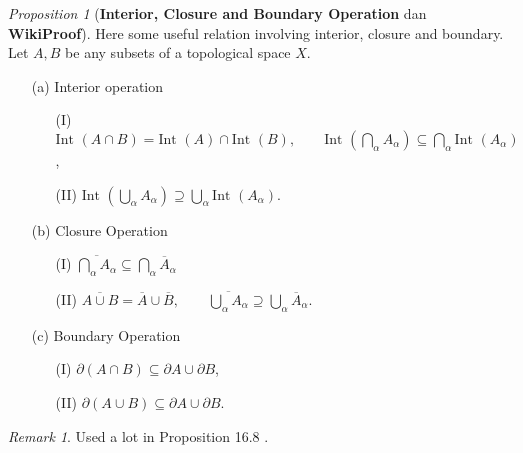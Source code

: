 \documentclass[a4paper]{article}
\theoremstyle{remark}
\newtheorem*{remark}{Remark}
\newtheorem{prop}{Proposition}
\newcommand{\doo}{\partial}    %
\newcommand{\subhim}{\subseteq} %
\newcommand{\Inter}{\text{Int }} %
\begin{document}
\begin{prop}[\textbf{Interior, Closure and Boundary Operation} \cite{bredon} dan \textbf{WikiProof}] Here some useful relation involving interior, closure and boundary. Let $A,B$ be any subsets of a topological space $X$.
\begin{enumerate}[nolistsep]
	\item[(a)] Interior operation 
	\begin{enumerate}[nolistsep]
	\item [(I)] $\Inter (A \cap B) = \Inter (A) \cap \Inter (B), \qquad \Inter (\bigcap_{\alpha} A_{\alpha}) \subhim \bigcap_{\alpha} \Inter (A_{\alpha})$,
	\item [(II)] $\Inter (\bigcup_{\alpha} A_{\alpha}) \supseteq \bigcup_{\alpha} \Inter(A_{\alpha})$.
    \end{enumerate}
\item[(b)] Closure Operation
    \begin{enumerate}[nolistsep]
	\item[(I)] $\overline{\bigcap_{\alpha} A_{\alpha}} \subhim \bigcap_{\alpha}\overline{A}_{\alpha}$
	\item[(II)] $\overline{A \cup B} = \overline{A} \cup \overline{B}, \qquad \overline{\bigcup_{\alpha} A_{\alpha}} \supseteq \bigcup_{\alpha} \overline{A}_{\alpha}$.   
    \end{enumerate}		
\item [(c)] Boundary Operation
\begin{enumerate}[nolistsep]
	\item[(I)] $\doo (A \cap B) \subhim \doo A \cup \doo B$,
	\item[(II)] $\doo (A \cup B) \subhim \doo A \cup \doo B$.
\end{enumerate}
\end{enumerate}
\end{prop}
\begin{remark}
	Used a lot in Proposition 16.8 \cite{LeeSM}.
\end{remark}
\end{document}
